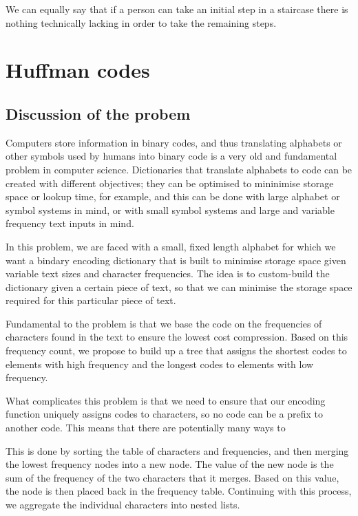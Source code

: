 \documentclass[11pt]{article}
\begin{document}
We can equally say that if a person can take an initial step in a
staircase there is nothing technically lacking in order to take the
remaining steps.

    \section{Huffman codes}\label{huffman-codes}

\subsection{Discussion of the probem}\label{discussion-of-the-probem}

Computers store information in binary codes, and thus translating
alphabets or other symbols used by humans into binary code is a very old
and fundamental problem in computer science. Dictionaries that translate
alphabets to code can be created with different objectives; they can be
optimised to mininimise storage space or lookup time, for example, and
this can be done with large alphabet or symbol systems in mind, or with
small symbol systems and large and variable frequency text inputs in
mind.

In this problem, we are faced with a small, fixed length alphabet for
which we want a bindary encoding dictionary that is built to minimise
storage space given variable text sizes and character frequencies. The
idea is to custom-build the dictionary given a certain piece of text, so
that we can minimise the storage space required for this particular
piece of text.

Fundamental to the problem is that we base the code on the frequencies
of characters found in the text to ensure the lowest cost compression.
Based on this frequency count, we propose to build up a tree that
assigns the shortest codes to elements with high frequency and the
longest codes to elements with low frequency.

What complicates this problem is that we need to ensure that our
encoding function uniquely assigns codes to characters, so no code can
be a prefix to another code. This means that there are potentially many
ways to

This is done by sorting the table of characters and frequencies, and
then merging the lowest frequency nodes into a new node. The value of
the new node is the sum of the frequency of the two characters that it
merges. Based on this value, the node is then placed back in the
frequency table. Continuing with this process, we aggregate the
individual characters into nested lists.
\end{document}
